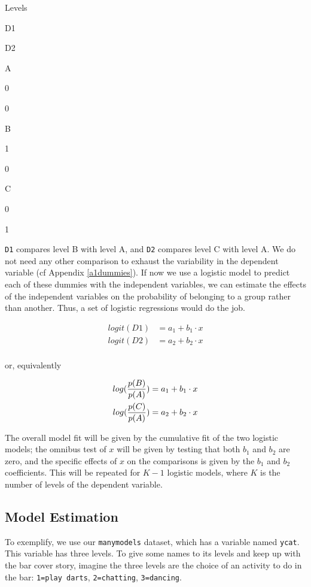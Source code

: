 \documentclass[
]{book}
\begin{document}
Levels

D1

D2

A

0

0

B

1

0

C

0

1

\texttt{D1} compares level B with level A, and \texttt{D2} compares level C with level A. We do not need any other comparison to exhaust the variability in the dependent variable (cf Appendix \ref{a1dummies}). If now we use a logistic model to predict each of these dummies with the independent variables, we can estimate the effects of the independent variables on the probability of belonging to a group rather than another. Thus, a set of logistic regressions would do the job.

\begin{align*}
 logit(D1)  &= a_1 + b_1 \cdot x   \\
 logit(D2)  &= a_2 + b_2 \cdot x   \\
\end{align*}

or, equivalently

\begin{align*}
 log({p(B) \over p(A)})  &= a_1 + b_1 \cdot x   \\
 log({p(C) \over p(A)})  &= a_2 + b_2 \cdot x   \\
\end{align*}

The overall model fit will be given by the cumulative fit of the two logistic models; the omnibus test of \(x\) will be given by testing that both \(b_1\) and \(b_2\) are zero, and the specific effects of \(x\) on the comparisons is given by the \(b_1\) and \(b_2\) coefficients. This will be repeated for \(K-1\) logistic models, where \(K\) is the number of levels of the dependent variable.

\hypertarget{model-estimation-2}{%
\subsection{Model Estimation}\label{model-estimation-2}}

To exemplify, we use our \texttt{manymodels} dataset, which has a variable named \texttt{ycat}. This variable has three levels. To give some names to its levels and keep up with the bar cover story, imagine the three levels are the choice of an activity to do in the bar: \texttt{1=play\ darts}, \texttt{2=chatting}, \texttt{3=dancing}.
\end{document}
